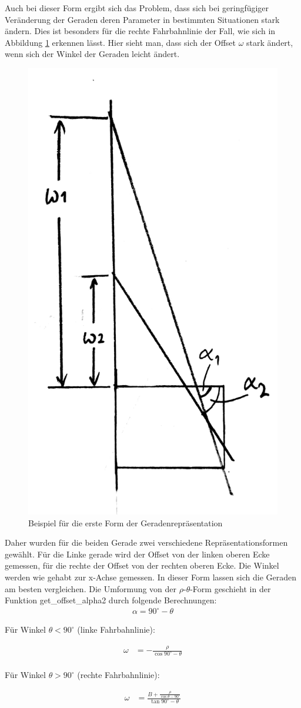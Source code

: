	Auch bei dieser Form ergibt sich das Problem, dass sich bei geringfügiger Veränderung der Geraden deren Parameter in bestimmten Situationen stark ändern. Dies ist besonders für die rechte Fahrbahnlinie der Fall, wie sich in Abbildung \ref{fig:alpha_omega2} erkennen lässt. Hier sieht man, dass sich der Offset $\omega$ stark ändert, wenn sich der Winkel der Geraden leicht ändert.


	\begin{figure}[H]
		\centering
		\includegraphics[width=.3\linewidth]{images/alpha_omega2.jpg}
		\caption{Beispiel für die erste Form der Geradenrepräsentation}
		\label{fig:alpha_omega2}
	\end{figure}

	Daher wurden für die beiden Gerade zwei verschiedene Repräsentationsformen gewählt. Für die Linke gerade wird der Offset von der linken oberen Ecke gemessen, für die rechte der Offset von der rechten oberen Ecke. Die Winkel werden wie gehabt zur x-Achse gemessen. In dieser Form lassen sich die Geraden am besten vergleichen. Die Umformung von der $\rho$-$\theta$-Form geschieht in der Funktion get\_offset\_alpha2 durch folgende Berechnungen: \\
	
	\begin{align*}
	\alpha=90^{\circ}-\theta
	\end{align*}
	
	
	Für Winkel $\theta<90^\circ$ (linke Fahrbahnlinie):
	
	\begin{align*}
	\omega&=-\frac{\rho}{\cos{90^{\circ}-\theta}} \\
	\end{align*}
	
	Für Winkel $\theta>90^\circ$ (rechte Fahrbahnlinie):
	
	\begin{align*}
	\omega&=\frac{B+\frac{\rho}{\cos{\theta-90^{\circ}}}}{\tan{90^{\circ}-\theta}} \\
	\end{align*}
	

